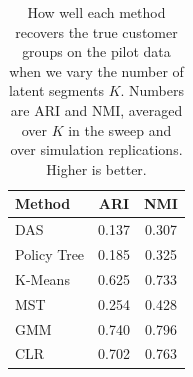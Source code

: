 \begin{table}[htbp]
\centering
\caption{How well each method recovers the true customer groups on the pilot data when we vary the number of latent segments $K$. Numbers are ARI and NMI, averaged over $K$ in the sweep and over simulation replications. Higher is better.}
\label{tab:app-ari-nmi-varying-K-avg}
\begin{tabular}{lcc}
\toprule
Method & ARI & NMI \\
\midrule
DAS & 0.137 & 0.307 \\
Policy Tree & 0.185 & 0.325 \\
K-Means & 0.625 & 0.733 \\
MST & 0.254 & 0.428 \\
GMM & 0.740 & 0.796 \\
CLR & 0.702 & 0.763 \\
\bottomrule
\end{tabular}
\end{table}
